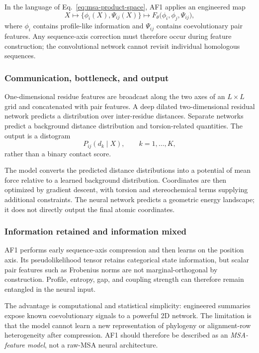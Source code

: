 \documentclass[10pt]{article}
\begin{document}
In the language of Eq.~\ref{eq:msa-product-space}, AF1 applies an engineered map
\begin{equation}
X
\longmapsto
\bigl\{\phi_i(X),\Psi_{ij}(X)\bigr\}
\longmapsto
F_{\theta}\bigl(\phi_i,\phi_j,\Psi_{ij}\bigr),
\label{eq:af1-compression}
\end{equation}
where $\phi_i$ contains profile-like information and $\Psi_{ij}$ contains coevolutionary pair
features.  Any sequence-axis correction must therefore occur during feature construction; the
convolutional network cannot revisit individual homologous sequences.

\subsubsection{Communication, bottleneck, and output}

One-dimensional residue features are broadcast along the two axes of an $L\times L$ grid and
concatenated with pair features.  A deep dilated two-dimensional residual network predicts a
distribution over inter-residue distances.  Separate networks predict a background distance
distribution and torsion-related quantities.  The output is a distogram
\begin{equation}
P_{ij}(d_k\mid X),
\qquad k=1,\ldots,K,
\label{eq:af1-distogram}
\end{equation}
rather than a binary contact score.

The model converts the predicted distance distributions into a potential of mean force relative
to a learned background distribution.  Coordinates are then optimized by gradient descent, with
torsion and stereochemical terms supplying additional constraints.  The neural network predicts a
geometric energy landscape; it does not directly output the final atomic coordinates.

\subsubsection{Information retained and information mixed}

AF1 performs early sequence-axis compression and then learns on the position axis.  Its
pseudolikelihood tensor retains categorical state information, but scalar pair features such as
Frobenius norms are not marginal-orthogonal by construction.  Profile, entropy, gap, and coupling
strength can therefore remain entangled in the neural input.

The advantage is computational and statistical simplicity: engineered summaries expose known
coevolutionary signals to a powerful 2D network.  The limitation is that the model cannot learn a
new representation of phylogeny or alignment-row heterogeneity after compression.  AF1 should
therefore be described as an \emph{MSA-feature model}, not a raw-MSA neural architecture.
\end{document}
